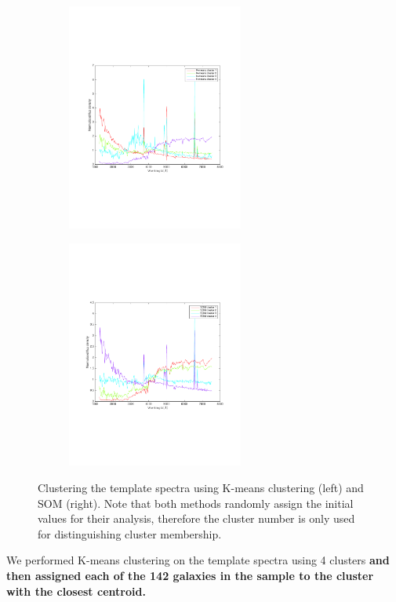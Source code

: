 \begin{figure}
\begin{subfigure}[b]{0.49\textwidth}
\centering
\includegraphics[width=.99\textwidth, height= 7.5cm]{k_means_images/classified_group_in_4cluster_kinney.pdf}
\end{subfigure}
\hfill
\begin{subfigure}[b]{0.49\textwidth}
\centering \includegraphics[width=.99\textwidth, height= 7.5cm]{k_means_images/classified_group_in_4cluster_som.pdf}
\end{subfigure}
\caption{Clustering the  template spectra using K-means clustering (left) and SOM (right). Note that both methods randomly assign the initial values for their analysis, therefore the cluster number is only used for distinguishing cluster membership.}
\label{fig: som_k_means_4}
\end{figure}
        
        We performed K-means clustering on the  template spectra using 4 clusters \textbf{and then assigned each of the 142 galaxies in the   sample to the cluster with the closest centroid.}
        
